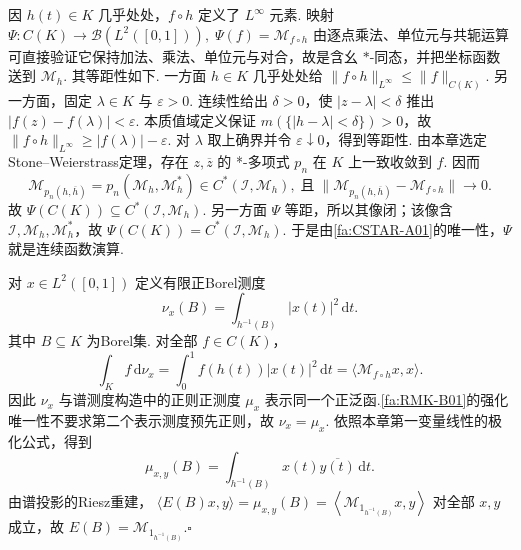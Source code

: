 \begin{FAProof}
因 \(\displaystyle h(t)\in K\) 几乎处处，\(\displaystyle f\circ h\) 定义了 \(\displaystyle L^\infty\) 元素. 映射
\(\displaystyle \Psi:C(K)\longrightarrow\mathcal B(L^2([0,1])), \; \Psi(f)=\mathcal M_{f\circ h}\)
由逐点乘法、单位元与共轭运算可直接验证它保持加法、乘法、单位元与对合，故是含幺 \(\displaystyle *\)-同态，并把坐标函数送到 \(\displaystyle\mathcal M_h\). 其等距性如下. 一方面 \(\displaystyle h\in K\) 几乎处处给
\(\displaystyle \|f\circ h\|_{L^\infty}\leqslant\|f\|_{C(K)}.\)
另一方面，固定 \(\displaystyle\lambda\in K\) 与 \(\displaystyle\varepsilon>0\). 连续性给出 \(\displaystyle\delta>0\)，使 \(\displaystyle|z-\lambda|<\delta\) 推出 \(\displaystyle|f(z)-f(\lambda)|<\varepsilon\). 本质值域定义保证 \(\displaystyle m(\{|h-\lambda|<\delta\})>0\)，故
\(\displaystyle \|f\circ h\|_{L^\infty}\geqslant|f(\lambda)|-\varepsilon.\)
对 \(\displaystyle\lambda\) 取上确界并令 \(\displaystyle\varepsilon\downarrow0\)，得到等距性. 由本章选定Stone--Weierstrass定理，存在 \(\displaystyle z,\overline z\) 的 *-多项式 \(\displaystyle p_n\) 在 \(\displaystyle K\) 上一致收敛到 \(\displaystyle f\). 因而
\[
\mathcal M_{p_n(h,\overline h)}
=p_n(\mathcal M_h,\mathcal M_h^*)
\in C^*(\mathcal I,\mathcal M_h),
\;\text{且}\;
\|\mathcal M_{p_n(h,\overline h)}-\mathcal M_{f\circ h}\|
\longrightarrow0.
\]
故 \(\displaystyle\Psi(C(K))\subseteq C^*(\mathcal I,\mathcal M_h)\). 另一方面 \(\displaystyle\Psi\) 等距，所以其像闭；该像含 \(\displaystyle\mathcal I,\mathcal M_h,\mathcal M_h^*\)，故 \(\displaystyle\Psi(C(K))=C^*(\mathcal I,\mathcal M_h)\). 于是由\autoref{fa:CSTAR-A01}的唯一性，\(\displaystyle\Psi\) 就是连续函数演算.

对 \(\displaystyle x\in L^2([0,1])\) 定义有限正Borel测度
\[
\nu_x(B)=\int_{h^{-1}(B)}|x(t)|^2\,\mathrm{d}t.
\]
其中 \(\displaystyle B\subseteq K\) 为Borel集.
对全部 \(\displaystyle f\in C(K)\)，
\[
\int_K f\,\mathrm{d}\nu_x
=\int_0^1 f(h(t))|x(t)|^2\,\mathrm{d}t
=\langle\mathcal M_{f\circ h}x,x\rangle.
\]
因此 \(\displaystyle\nu_x\) 与谱测度构造中的正则正测度 \(\displaystyle\mu_x\) 表示同一个正泛函.\autoref{fa:RMK-B01}的强化唯一性不要求第二个表示测度预先正则，故 \(\displaystyle\nu_x=\mu_x\). 依照本章第一变量线性的极化公式，得到
\[
\mu_{x,y}(B)=\int_{h^{-1}(B)}x(t)\overline{y(t)}\,\mathrm{d}t.
\]
由谱投影的Riesz重建，
\(\displaystyle \langle E(B)x,y\rangle =\mu_{x,y}(B) =\left\langle\mathcal M_{1_{h^{-1}(B)}}x,y\right\rangle\)
对全部 \(\displaystyle x,y\) 成立，故 \(\displaystyle E(B)=\mathcal M_{1_{h^{-1}(B)}}\).\hfill\(\square\)
\end{FAProof}

